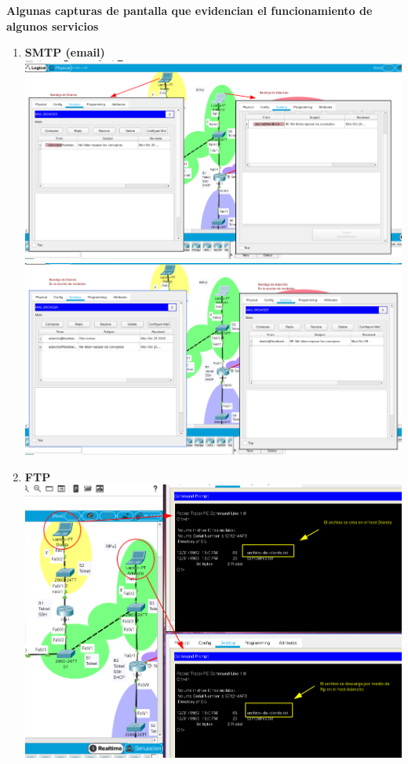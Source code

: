 \documentclass{article}
\begin{document}
\textbf{Algunas capturas de pantalla que evidencian el funcionamiento de 
algunos servicios}
\begin{enumerate}[label=\textbf{\arabic*.}]
  \item \textbf{SMTP (email)}\\[5mm]
  \includegraphics[width=0.9\linewidth]{correo-ev01.png}\\[5mm]
  \includegraphics[width=0.9\linewidth]{correo-ev02.png}
  
  \newpage
  \item \textbf{FTP}\\[5mm]
  \includegraphics[width=\linewidth]{ftp-ev01.png}
  

\end{enumerate}
\end{document}
